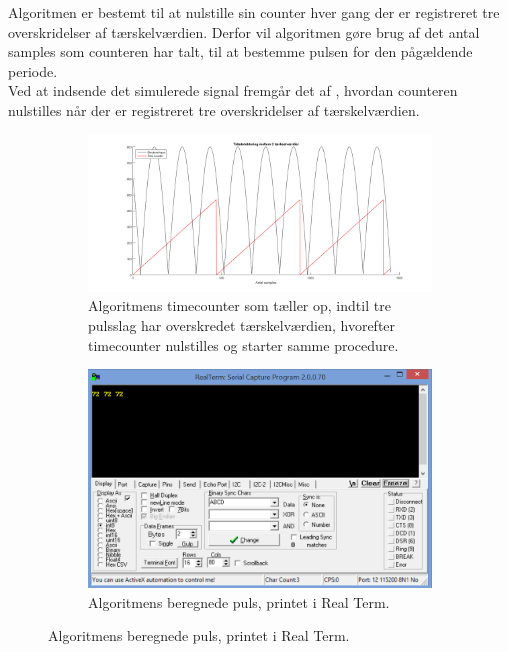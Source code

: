 Algoritmen er bestemt til at nulstille sin counter hver gang der er registreret tre overskridelser af tærskelværdien. Derfor vil algoritmen gøre brug af det antal samples som counteren har talt, til at bestemme pulsen for den pågældende periode. \\
Ved at indsende det simulerede signal fremgår det af , hvordan counteren nulstilles når der er registreret tre overskridelser af tærskelværdien. 

\begin{figure}[H]
	\centering
\begin{subfigure}{.5\textwidth}
  \centering
	\includegraphics[scale=0.5]{figures/cDesign/timecounter_puls_pic.png}
	\caption{Algoritmens timecounter som tæller op, indtil tre pulsslag har overskredet tærskelværdien, hvorefter timecounter nulstilles og starter samme procedure.}
\end{subfigure}%
\begin{subfigure}{.5\textwidth}
	\centering
	\includegraphics[scale=0.5]{figures/cDesign/Puls_test_realterm.png}
	\caption{Algoritmens beregnede puls, printet i Real Term.}
\end{subfigure}
\label{fig:timecounter_puls_realterm}
\end{figure}


